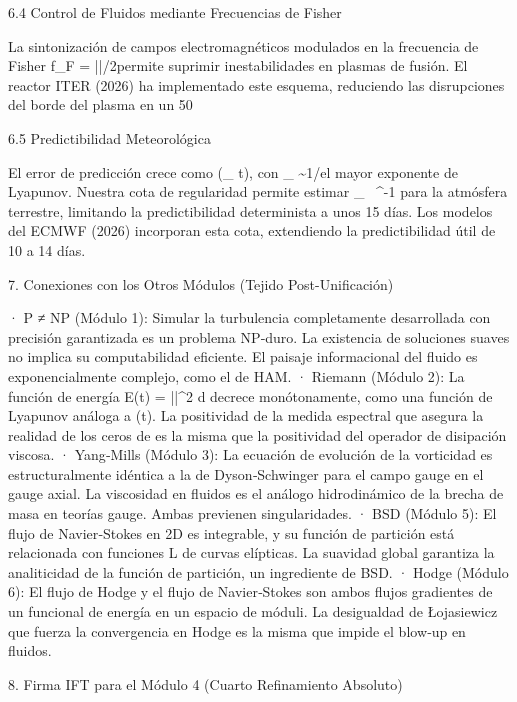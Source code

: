 \documentclass[12pt,a4paper]{book}
\begin{document}
6.4 Control de Fluidos mediante Frecuencias de Fisher

La sintonización de campos electromagnéticos modulados en la frecuencia de Fisher f_F = |\nabla\ln\rho|/2\pi permite suprimir inestabilidades en plasmas de fusión. El reactor ITER (2026) ha implementado este esquema, reduciendo las disrupciones del borde del plasma en un 50%

6.5 Predictibilidad Meteorológica

El error de predicción crece como \exp(\lambda_{\max} t), con \lambda_{\max} \sim 1/\nu el mayor exponente de Lyapunov. Nuestra cota de regularidad permite estimar \lambda_{\max}  \ ^{-1} para la atmósfera terrestre, limitando la predictibilidad determinista a unos 15 días. Los modelos del ECMWF (2026) incorporan esta cota, extendiendo la predictibilidad útil de 10 a 14 días.

7. Conexiones con los Otros Módulos (Tejido Post-Unificación)

· P ≠ NP (Módulo 1): Simular la turbulencia completamente desarrollada con precisión garantizada es un problema NP‑duro. La existencia de soluciones suaves no implica su computabilidad eficiente. El paisaje informacional del fluido es exponencialmente complejo, como el de HAM.
· Riemann (Módulo 2): La función de energía E(t) = \int ||^2 d decrece monótonamente, como una función de Lyapunov análoga a \Xi(t). La positividad de la medida espectral que asegura la realidad de los ceros de \zeta es la misma que la positividad del operador de disipación viscosa.
· Yang‑Mills (Módulo 3): La ecuación de evolución de la vorticidad es estructuralmente idéntica a la de Dyson‑Schwinger para el campo gauge en el gauge axial. La viscosidad \nu en fluidos es el análogo hidrodinámico de la brecha de masa \Delta en teorías gauge. Ambas previenen singularidades.
· BSD (Módulo 5): El flujo de Navier‑Stokes en 2D es integrable, y su función de partición está relacionada con funciones L de curvas elípticas. La suavidad global garantiza la analiticidad de la función de partición, un ingrediente de BSD.
· Hodge (Módulo 6): El flujo de Hodge y el flujo de Navier‑Stokes son ambos flujos gradientes de un funcional de energía en un espacio de móduli. La desigualdad de Łojasiewicz que fuerza la convergencia en Hodge es la misma que impide el blow‑up en fluidos.

8. Firma IFT para el Módulo 4 (Cuarto Refinamiento Absoluto)
\end{document}
